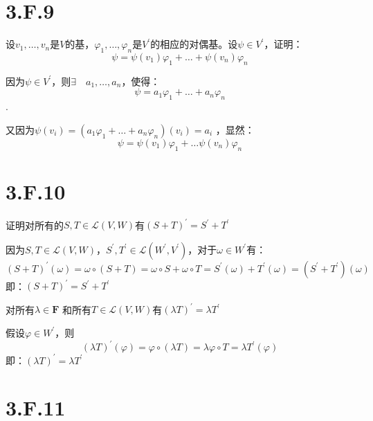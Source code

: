 \documentclass[10pt,a4paper,UTF8]{article}
\begin{document}
\section{3.F.9}
\label{sec:org7cbdbe1}


\begin{problem}
设\(v_{1},\ldots ,v_{n}\)是\(V\)的基，\(\varphi_{1},\ldots ,\varphi_{n}\)是\(V^{'}\)的相应的对偶基。设\(\psi \in V^{'}\)，证明：\[\psi = \psi(v_{1})\varphi_{1} + \ldots + \psi(v_{n})\varphi_{n} \]
\end{problem}

\begin{answer}
因为\(\psi\in V^{'}\)，则\(\exists \quad a_{1},\ldots ,a_{n}\)，使得：\[\psi = a_{1}\varphi_{1} + \ldots + a_{n}\varphi_{n}\].

又因为\(\psi(v_{i}) = (a_{1}\varphi_{1} + \ldots + a_{n}\varphi_{n})(v_{i}) = a_{i}\) ，显然：\[\psi = \psi(v_{1})\varphi_{1} + \ldots \psi(v_{n})\varphi_{n}\]
\end{answer}
\section{3.F.10}
\label{sec:org62211b4}


\begin{problem}
证明对所有的\(S,T\in \mathcal{L}(V,W)\)有\((S+T)^{'} = S^{'} + T^{'}\)
\end{problem}
\begin{answer}
因为\(S,T\in \mathcal{L}(V,W)\)，\(S^{'},T^{'}\in \mathcal{L}(W^{'},V^{'})\)，对于\(\omega \in W^{'}\)有：\[ (S + T)^{'}(\omega) = \omega \circ (S +T) = \omega \circ S + \omega \circ T = S^{'}(\omega) + T^{'}(\omega) = (S^{'} + T^{'})(\omega)\] 即：\((S+T)^{'} = S^{'} + T^{'}\)
\end{answer}

\begin{problem}
对所有\(\lambda \in \mathbf{F}\) 和所有\(T\in \mathcal{L}(V,W)\)有\((\lambda T)^{'} = \lambda T^{'}\)
\end{problem}

\begin{answer}
假设\(\varphi\in W^{'}\)，则\[(\lambda T)^{'}(\varphi) = \varphi \circ (\lambda T) = \lambda \varphi \circ T =  \lambda T^{'}(\varphi) \]即：\((\lambda T)^{'} = \lambda T^{'}\)
\end{answer}

\section{3.F.11}
\label{sec:org022fd7f}
\end{document}
